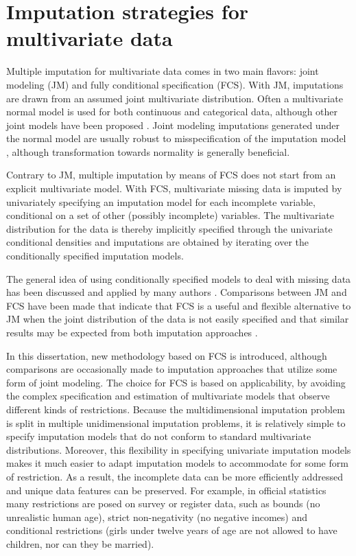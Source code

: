 \documentclass[10pt, fullpage, a4paper, titlepage]{article}
\begin{document}
\section{Imputation strategies for multivariate data}
\label{strategies}
Multiple imputation for multivariate data comes in two main flavors: joint modeling (JM) and fully conditional specification (FCS). With JM, imputations are drawn from an assumed joint multivariate distribution. Often a multivariate normal model is used for both continuous and categorical data, although other joint models have been proposed \citep[see e.g.][]{olkin1961multivariate, van1992imputation, SchaferJ1997, vGinkel2007, goldstein2009multilevel, chen2011multiple}. Joint modeling imputations generated under the normal model are usually robust to misspecification of the imputation model \citep{SchaferJ1997, demirtas2008plausibility}, although transformation towards normality is generally beneficial. 

Contrary to JM, multiple imputation by means of FCS does not start from an explicit multivariate model. With FCS, multivariate missing data is imputed by univariately specifying an imputation model for each incomplete variable, conditional on a set of other (possibly incomplete) variables. The multivariate distribution for the data is thereby implicitly specified through the univariate conditional densities and imputations are obtained by iterating over the conditionally specified imputation models. 

The general idea of using conditionally specified models to deal with missing data has been discussed and applied by many authors \citep[see e.g.][]{kennickell1991imputation, raghunathan1996multiple, oudshoorn1999flexible, brand1999development, stef1999fcs, van2000multivariate, raghunathan2001multivariate, faris2002multiple, VanbuurenFCS}. Comparisons between JM and FCS have been made that indicate that FCS is a useful and flexible alternative to JM when the joint distribution of the data is not easily specified \citep{van2007multiple} and that similar results may be expected from both imputation approaches \citep{lee2010multiple}.

In this dissertation, new methodology based on FCS is introduced, although comparisons are occasionally made to imputation approaches that utilize some form of joint modeling. The choice for FCS is based on applicability, by avoiding the complex specification and estimation of multivariate models that observe different kinds of restrictions. Because the multidimensional imputation problem is split in multiple unidimensional imputation problems, it is relatively simple to specify imputation models that do not conform to standard multivariate distributions. Moreover, this flexibility in specifying univariate imputation models makes it much easier to adapt imputation models to accommodate for some form of restriction. As a result, the incomplete data can be more efficiently addressed and unique data features can be preserved. For example, in official statistics many restrictions are posed on survey or register data, such as bounds (no unrealistic human age), strict non-negativity (no negative incomes) and conditional restrictions (girls under twelve years of age are not allowed to have children, nor can they be married). 
\end{document}
